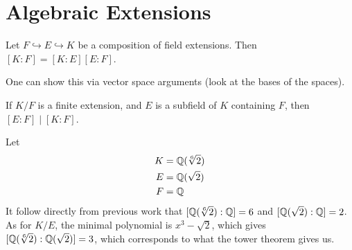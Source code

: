 \documentclass{memoir}
\begin{document}


\section{Algebraic Extensions}
\label{sec:algebraic_extensions}

\begin{thm}
	Let \(F \hookrightarrow E \hookrightarrow K\) be a composition of field extensions. Then \([K:F] = [K:E] [E:F]\).
\end{thm}
One can show this via vector space arguments (look at the bases of the spaces).
\begin{cor}
	If \(K / F\) is a finite extension, and \(E\) is a subfield of \(K\) containing \(F\), then \([E:F] \mid [K:F] \).
\end{cor}

\begin{exmp}
	Let 
\begin{align*}
	K &= \mathbb{Q}(\sqrt[6]{2} )\\
	E &= \mathbb{Q}(\sqrt{2} )\\
	F &= \mathbb{Q}
\end{align*} It follow directly from previous work that \([\mathbb{Q}(\sqrt[6]{2}) : \mathbb{Q}] = 6\) and \([\mathbb{Q}(\sqrt{2} ):\mathbb{Q}] = 2\). As for \(K / E\), the minimal polynomial is \(x^3-\sqrt{2} \), which gives \([\mathbb{Q}(\sqrt[6]{2} ): \mathbb{Q}(\sqrt{2} )] = 3\), which corresponds to what the tower theorem gives us.
\end{exmp}
\end{document}
